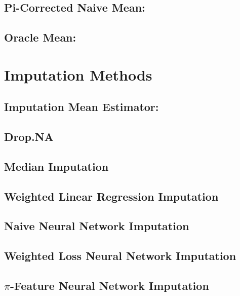 \documentclass[12pt,twoside]{reedthesis}
\begin{document}
\subsection{Pi-Corrected Naive Mean:}\label{pi-corrected-naive-mean}

\subsection{Oracle Mean:}\label{oracle-mean}

\section{Imputation Methods}\label{imputation-methods}

\subsection{Imputation Mean Estimator:}\label{imputation-mean-estimator}

\subsection{Drop.NA}\label{drop.na}

\subsection{Median Imputation}\label{median-imputation}

\subsection{Weighted Linear Regression
Imputation}\label{weighted-linear-regression-imputation}

\subsection{Naive Neural Network
Imputation}\label{naive-neural-network-imputation}

\subsection{Weighted Loss Neural Network
Imputation}\label{weighted-loss-neural-network-imputation}

\subsection{\texorpdfstring{\(\pi\)-Feature Neural Network
Imputation}{\textbackslash{}pi-Feature Neural Network Imputation}}\label{pi-feature-neural-network-imputation}
\end{document}
